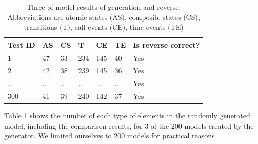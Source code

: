 \begin{table}
\centering
\caption{Three of model results of generation and reverse: Abbreviations are atomic states (AS), composite states (CS), transitions (T), call events (CE), time events (TE)}
\label{table:law1-resultat}
\begin{tabular}{|l|l|l|l|l|l|l|}
\hline
\rowcolor{Gray}
Test ID & AS & CS & T & CE & TE & Is reverse correct? \\ \hline
1       & 47 & 33 & 234 & 145 & 40 & Yes                 \\ \hline
2       & 42 & 38 & 239 & 145 & 36 & Yes                 \\ \hline
..      & .. & .. & .. & .. & .. & Yes                 \\ \hline
300       & 41 & 39 &240 & 142 & 37 & Yes                 \\ \hline
\end{tabular}
\end{table}
 
 

Table 1 shows the number of each type of elements in the randomly generated model, including the comparison results, for 3 of the 200 models created by the generator. We limited ourselves to 200 models for practical reasons

